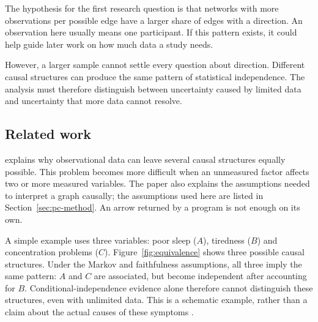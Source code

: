 \documentclass[11pt,a4paper]{article}
\begin{document}
The hypothesis for the first research question is that networks with more observations per possible edge have a larger share of edges with a direction. An observation here usually means one participant. If this pattern exists, it could help guide later work on how much data a study needs.

However, a larger sample cannot settle every question about direction. Different causal structures can produce the same pattern of statistical independence. The analysis must therefore distinguish between uncertainty caused by limited data and uncertainty that more data cannot resolve.

\subsection{Related work}
\citet{huber2024} explains why observational data can leave several causal structures equally possible. This problem becomes more difficult when an unmeasured factor affects two or more measured variables. The paper also explains the assumptions needed to interpret a graph causally; the assumptions used here are listed in Section~\ref{sec:pc-method}. An arrow returned by a program is not enough on its own.

A simple example uses three variables: poor sleep ($A$), tiredness ($B$) and concentration problems ($C$). Figure~\ref{fig:equivalence} shows three possible causal structures. Under the Markov and faithfulness assumptions, all three imply the same pattern: $A$ and $C$ are associated, but become independent after accounting for $B$. Conditional-independence evidence alone therefore cannot distinguish these structures, even with unlimited data. This is a schematic example, rather than a claim about the actual causes of these symptoms \citep{huber2024,spirtes1993}.
\end{document}
